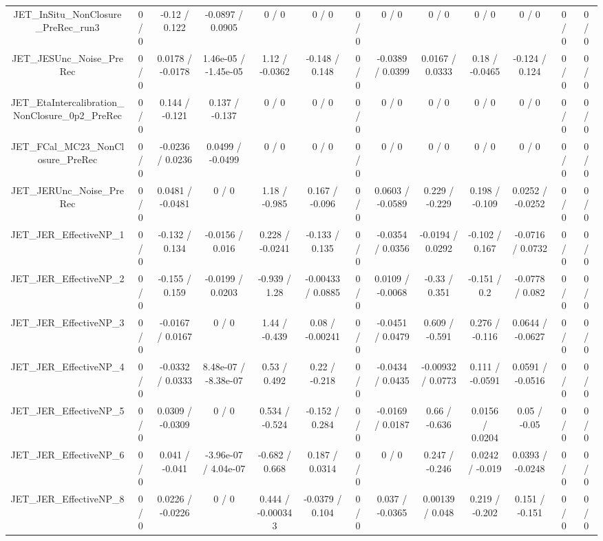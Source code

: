 \documentclass[10pt]{article}
\begin{document}
\begin{table}[htbp]
\begin{center}
\begin{tabular}{|c|c|c|c|c|c|c|c|c|c|c|c|c|}
  JET_InSitu_NonClosure_PreRec_run3 & 0 / 0 & -0.12 / 0.122 & -0.0897 / 0.0905 & 0 / 0 & 0 / 0 & 0 / 0 & 0 / 0 & 0 / 0 & 0 / 0 & 0 / 0 & 0 / 0 & 0 / 0 \\ 
  JET_JESUnc_Noise_PreRec & 0 / 0 & 0.0178 / -0.0178 & 1.46e-05 / -1.45e-05 & 1.12 / -0.0362 & -0.148 / 0.148 & 0 / 0 & -0.0389 / 0.0399 & 0.0167 / 0.0333 & 0.18 / -0.0465 & -0.124 / 0.124 & 0 / 0 & 0 / 0 \\ 
  JET_EtaIntercalibration_NonClosure_0p2_PreRec & 0 / 0 & 0.144 / -0.121 & 0.137 / -0.137 & 0 / 0 & 0 / 0 & 0 / 0 & 0 / 0 & 0 / 0 & 0 / 0 & 0 / 0 & 0 / 0 & 0 / 0 \\ 
  JET_FCal_MC23_NonClosure_PreRec & 0 / 0 & -0.0236 / 0.0236 & 0.0499 / -0.0499 & 0 / 0 & 0 / 0 & 0 / 0 & 0 / 0 & 0 / 0 & 0 / 0 & 0 / 0 & 0 / 0 & 0 / 0 \\ 
  JET_JERUnc_Noise_PreRec & 0 / 0 & 0.0481 / -0.0481 & 0 / 0 & 1.18 / -0.985 & 0.167 / -0.096 & 0 / 0 & 0.0603 / -0.0589 & 0.229 / -0.229 & 0.198 / -0.109 & 0.0252 / -0.0252 & 0 / 0 & 0 / 0 \\ 
  JET_JER_EffectiveNP_1 & 0 / 0 & -0.132 / 0.134 & -0.0156 / 0.016 & 0.228 / -0.0241 & -0.133 / 0.135 & 0 / 0 & -0.0354 / 0.0356 & -0.0194 / 0.0292 & -0.102 / 0.167 & -0.0716 / 0.0732 & 0 / 0 & 0 / 0 \\ 
  JET_JER_EffectiveNP_2 & 0 / 0 & -0.155 / 0.159 & -0.0199 / 0.0203 & -0.939 / 1.28 & -0.00433 / 0.0885 & 0 / 0 & 0.0109 / -0.0068 & -0.33 / 0.351 & -0.151 / 0.2 & -0.0778 / 0.082 & 0 / 0 & 0 / 0 \\ 
  JET_JER_EffectiveNP_3 & 0 / 0 & -0.0167 / 0.0167 & 0 / 0 & 1.44 / -0.439 & 0.08 / -0.00241 & 0 / 0 & -0.0451 / 0.0479 & 0.609 / -0.591 & 0.276 / -0.116 & 0.0644 / -0.0627 & 0 / 0 & 0 / 0 \\ 
  JET_JER_EffectiveNP_4 & 0 / 0 & -0.0332 / 0.0333 & 8.48e-07 / -8.38e-07 & 0.53 / 0.492 & 0.22 / -0.218 & 0 / 0 & -0.0434 / 0.0435 & -0.00932 / 0.0773 & 0.111 / -0.0591 & 0.0591 / -0.0516 & 0 / 0 & 0 / 0 \\ 
  JET_JER_EffectiveNP_5 & 0 / 0 & 0.0309 / -0.0309 & 0 / 0 & 0.534 / -0.524 & -0.152 / 0.284 & 0 / 0 & -0.0169 / 0.0187 & 0.66 / -0.636 & 0.0156 / 0.0204 & 0.05 / -0.05 & 0 / 0 & 0 / 0 \\ 
  JET_JER_EffectiveNP_6 & 0 / 0 & 0.041 / -0.041 & -3.96e-07 / 4.04e-07 & -0.682 / 0.668 & 0.187 / 0.0314 & 0 / 0 & 0 / 0 & 0.247 / -0.246 & 0.0242 / -0.019 & 0.0393 / -0.0248 & 0 / 0 & 0 / 0 \\ 
  JET_JER_EffectiveNP_8 & 0 / 0 & 0.0226 / -0.0226 & 0 / 0 & 0.444 / -0.000343 & -0.0379 / 0.104 & 0 / 0 & 0.037 / -0.0365 & 0.00139 / 0.048 & 0.219 / -0.202 & 0.151 / -0.151 & 0 / 0 & 0 / 0 \\ 

\end{tabular}
\end{center}
\end{table}
\end{document}

